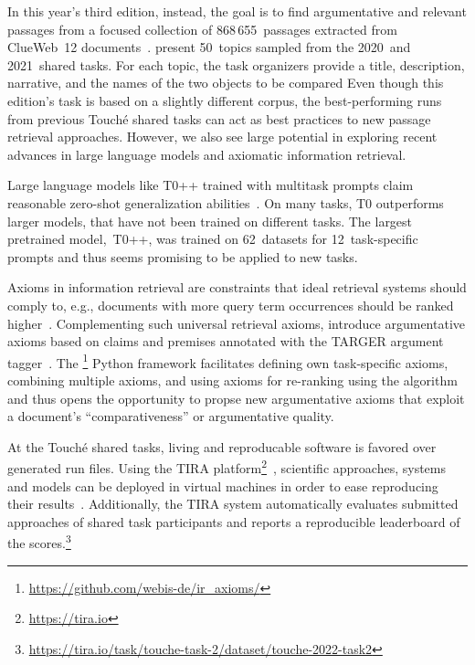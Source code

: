 In this year's third edition, instead, the goal is to find argumentative and relevant passages from a focused collection of 868\,655~passages extracted from ClueWeb~12 documents~\cite{BondarenkoFKSGBPBSWPH2022}.
\citeauthor{BondarenkoFKSGBPBSWPH2022} present 50~topics sampled from the 2020~and 2021~shared tasks. 
For each topic, the task organizers provide a title, description, narrative, and the names of the two objects to be compared
Even though this edition's task is based on a slightly different corpus, the best-performing runs from previous Touché shared tasks can act as best practices to new passage retrieval approaches.
However, we also see large potential in exploring recent advances in large language models and axiomatic information retrieval.

Large language models like T0++ trained with multitask prompts claim reasonable zero-shot generalization abilities~\cite{SanhWRBSACSLRDBXTSSKCNDCJWMSYPBWNRSSFFTBGBWR2021}.
On many tasks, T0 outperforms larger models, that have not been trained on different tasks. The largest pretrained model,~T0++, was trained on 62~datasets for 12~task-specific prompts and thus seems promising to be applied to new tasks.

Axioms in information retrieval are constraints that ideal retrieval systems should comply to, e.g., documents with more query term occurrences should be ranked higher~\citet{FangTZ2004}.
Complementing such universal retrieval axioms, \citet{BondarenkoHVSPB2018} introduce argumentative axioms based on claims and premises annotated with the TARGER argument tagger~\cite{ChernodubOHBHBP2019}.
The \iraxioms\footnote{\url{https://github.com/webis-de/ir_axioms/}} Python framework facilitates defining own task-specific axioms, combining multiple axioms, and using axioms for re-ranking using the \KwikSort algorithm~\cite{BondarenkoFRSVH2022,HagenVGS2016} and thus opens the opportunity to propse new argumentative axioms that exploit a document's ``comparativeness'' or argumentative quality.

At the Touché shared tasks, living and reproducable software is favored over generated run files.
Using the TIRA platform\footnote{\url{https://tira.io}}~\cite{PotthastGWS2019}, scientific approaches, systems and models can be deployed in virtual machines in order to ease reproducing their results~\cite{PotthastGWS2019}.
Additionally, the TIRA system automatically evaluates submitted approaches of shared task participants and reports a reproducible leaderboard of the  scores.\footnote{\url{https://tira.io/task/touche-task-2/dataset/touche-2022-task2}}
